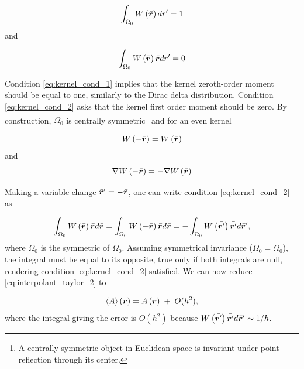 % 
\begin{equation} \label{eq:kernel_cond_1}
\int_{\Omega_0} {W \left( \bar{{\boldsymbol{r}}} \right)d{{r}}'}=1
\end{equation}
%
and

% 
\begin{equation} \label{eq:kernel_cond_2}
\int_{\Omega_0} {W \left( \bar{{\boldsymbol{r}}} \right)\bar{\boldsymbol{r}}d{{r}}'}=0
\end{equation}
%

Condition \eqref{eq:kernel_cond_1} implies that the kernel zeroth-order moment should be equal to one, similarly to the Dirac delta distribution. Condition \eqref{eq:kernel_cond_2} asks that the kernel first order moment should be zero. By construction, $\Omega_0$ is centrally symmetric\footnote{A centrally symmetric object in Euclidean space is invariant under point reflection through its center.} and for an even kernel 

% 
\begin{equation} \label{eq:kernel_cond_3}
W \left( -\bar{{\boldsymbol{r}}}\right) =W \left( \bar{{\boldsymbol{r}}}\right)
\end{equation}
%
and
% 
\begin{equation} \label{eq:kernel_cond_4}
\nabla W \left( -\bar{{\boldsymbol{r}}}\right) =-\nabla W \left( \bar{{\boldsymbol{r}}}\right)
\end{equation}
%

Making a variable change $\bar{{\boldsymbol{r}}}'=-\bar{{\boldsymbol{r}}}$, one can write condition \eqref{eq:kernel_cond_2} as

% 
\begin{equation} \label{eq:kernel_cond_5}
\int_{\Omega_0} {W \left( \bar{{\boldsymbol{r}}} \right) \bar{\boldsymbol{r}} d\bar{\boldsymbol{r}}} = \int_{\Omega_0} {W \left( -\bar{{\boldsymbol{r}}} \right) \bar{\boldsymbol{r}} d\bar{\boldsymbol{r}}} = - \int_{\bar{\Omega}_0} {W \left( \bar{{\boldsymbol{r}}'} \right) \bar{\boldsymbol{r}'} d\bar{\boldsymbol{r}}'},
\end{equation}
%
where $\bar{\Omega}_0$ is the symmetric of $\Omega_0$. Assuming symmetrical invariance ($\bar{\Omega}_0 = \Omega_0$), the integral must be equal to its opposite, true only if both integrals are null, rendering condition \eqref{eq:kernel_cond_2} satisfied. We can now reduce \eqref{eq:interpolant_taylor_2} to 

% 
\begin{equation} \label{eq:interpolant_taylor_3}
\left\langle {A} \right\rangle \left( {\boldsymbol{r}} \right) = A\left( {\boldsymbol{r}} \right) \;+\; O(h^2),
\end{equation}
%
where the integral giving the error is $O(h^2)$ because $W \left( \bar{{\boldsymbol{r}}'} \right) \bar{\boldsymbol{r}'} d\bar{\boldsymbol{r}}' \sim 1/h$. 

